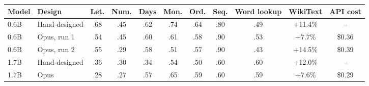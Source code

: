 \begin{tabular}{llccccccccc}
\toprule
Model & Design & Let. & Num. & Days & Mon. & Ord. & Seq. & Word lookup & WikiText & API cost \\
\midrule
0.6B & Hand-designed & .68 & .45 & .62 & .74 & .64 & .80 & .49 & +11.4\% & -- \\
0.6B & Opus, run 1 & .54 & .45 & .60 & .61 & .58 & .90 & .53 & +7.7\% & \$0.36 \\
0.6B & Opus, run 2 & .55 & .29 & .58 & .51 & .57 & .90 & .43 & +14.5\% & \$0.39 \\
\midrule
1.7B & Hand-designed & .36 & .30 & .34 & .54 & .50 & .60 & .60 & +12.0\% & -- \\
1.7B & Opus & .28 & .27 & .57 & .65 & .59 & .60 & .59 & +7.6\% & \$0.29 \\
\bottomrule
\end{tabular}
